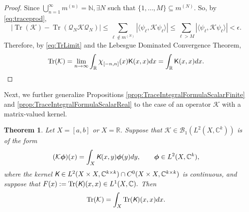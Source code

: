 \documentclass{birkjour}
\newtheorem{thm}{Theorem}[section]
\theoremstyle{definition}
\theoremstyle{remark}
\numberwithin{equation}{section}
\newcommand*{\bigchi}{\mbox{\large$\chi$}}%
\newcommand{\cB}{{\mathcal B}}
\begin{document}
\begin{proof}
Since $\bigcup_{n=1}^{\infty} m^{(n)} = \mathbb{N}, \exists N$ such that $\{1,\dots,M\} \subseteq m^{(N)}.$ 
So, by \eqref{eq:traceprod},
\begin{equation}
    |\operatorname{Tr}(\mathcal{K}) - \operatorname{Tr}(\mathcal{Q}_N \mathcal{K} \mathcal{Q}_N)| \leq \sum_{\ell \notin m^{(N)}} |\langle \psi_{\ell}, \mathcal{K}\psi_{\ell} \rangle|
    \leq \sum_{\ell > M}|\langle \psi_{\ell}, \mathcal{K} \psi_{\ell} \rangle| < \epsilon.
\end{equation}
Therefore, by  \eqref{eq:TrLimit} and the  Lebesgue Dominated Convergence Theorem,
\begin{equation}
\operatorname{Tr}(\mathcal{K}) 
= \lim_{n \rightarrow \infty} \int_{\mathbb{R}} \bigchi_{[-n,n]}(x) {\textsf K}(x,x) dx
=\label{TrKintK} \int_{\mathbb{R}} {\textsf K}(x,x) dx.
\end{equation}
\end{proof}

Next, we further generalize  Propositions \ref{prop:TraceIntegralFormulaScalarFinite} and \ref{prop:TraceIntegralFormulaScalarReal} to the case of
an operator $\mathcal{K}$ with a matrix-valued kernel.

\begin{thm}\label{thm:MatrixKernelTrace}
Let $X = [a,b]$ or $X = \mathbb{R}.$ Suppose that
 $\mathcal{K} \in \cB_1(L^2(X,\mathbb{C}^k))$ is of the form
\begin{equation}
    (\mathcal{K}\boldsymbol{\phi})(x) = \int_{X}\emph{\textsf{K}}(x,y) \boldsymbol{\phi}(y) dy, 
    \qquad \boldsymbol{\phi} \in L^2(X,\mathbb C^k),
\end{equation}
where the kernel $\emph{\textsf{K}} \in  L^2(X \times X, \mathbb{C}^{k \times k}) \cap 
C^0(X \times X, \mathbb{C}^{k \times k})$
is continuous, and suppose that
$F(x) := \operatorname{Tr}(\emph{\textsf{K}})(x,x) \in L^1(X,\mathbb{C}).$ Then
\begin{equation}\label{trboldK}
    \operatorname{Tr}(\mathcal{K}) = \int_X \operatorname{Tr}(\emph{\textsf{K}})(x,x) dx.
\end{equation}
\end{thm}
\end{document}
